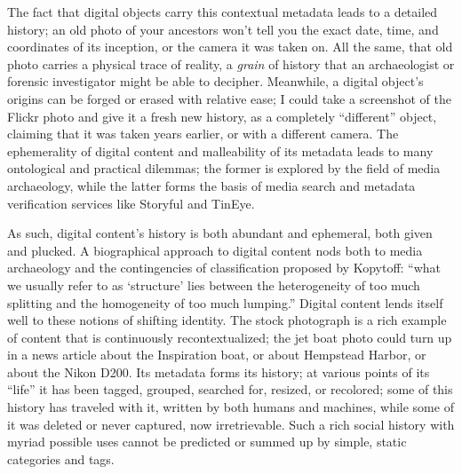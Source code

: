 The fact that digital objects carry this contextual metadata leads to a detailed history; an old photo of your ancestors won't tell you the exact date, time, and coordinates of its inception, or the camera it was taken on. All the same, that old photo carries a physical trace of reality, a \emph{grain} of history that an archaeologist or forensic investigator might be able to decipher. Meanwhile, a digital object's origins can be forged or erased with relative ease; I could take a screenshot of the Flickr photo and give it a fresh new history, as a completely ``different'' object, claiming that it was taken years earlier, or with a different camera. The ephemerality of digital content and malleability of its metadata leads to many ontological and practical dilemmas; the former is explored by the field of media archaeology, while the latter forms the basis of media search and metadata verification services like Storyful and TinEye.

As such, digital content's history is both abundant and ephemeral, both given and plucked. A biographical approach to digital content nods both to media archaeology and the contingencies of classification proposed by Kopytoff: ``what we usually refer to as `structure' lies between the heterogeneity of too much splitting and the homogeneity of too much lumping.''\autocite{appadurai_cultural_1986} Digital content lends itself well to these notions of shifting identity. The stock photograph is a rich example of content that is continuously recontextualized; the jet boat photo could turn up in a news article about the Inspiration boat, or about Hempstead Harbor, or about the Nikon D200. Its metadata forms its history; at various points of its ``life'' it has been tagged, grouped, searched for, resized, or recolored; some of this history has traveled with it, written by both humans and machines, while some of it was deleted or never captured, now irretrievable. Such a rich social history with myriad possible uses cannot be predicted or summed up by simple, static categories and tags.

